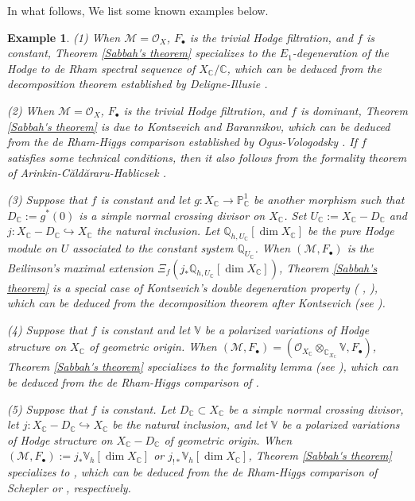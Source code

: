\documentclass[12pt, a4paper]{article}
\newtheorem{example}{Example}[section]
\begin{document}
 In what follows, We list some known examples below.
 \begin{example}\label{mod p proof Sabbah}
\upshape
(1) When $\mathcal M=\mathcal O_X$, $F_\bullet$ is the trivial Hodge filtration, and $f$ is constant, Theorem \ref{Sabbah's theorem} specializes to the $E_1$-degeneration of the Hodge to de Rham spectral sequence of $X_\mathbb{C}/\mathbb C$, which can be deduced from the decomposition theorem established by Deligne-Illusie \cite[Th\'eorème 2.1]{DI}.

(2) When $\mathcal M=\mathcal O_X$, $F_\bullet$ is the trivial Hodge filtration, and $f$ is dominant, Theorem \ref{Sabbah's theorem} is due to Kontsevich and Barannikov, which can be deduced from the de Rham-Higgs comparison established by Ogus-Vologodsky \cite[Theorem 4.23, 2]{OV}. If $f$ satisfies some technical conditions, then it also follows from the formality theorem of Arinkin-C\u{a}ld\u{a}raru-Hablicsek \cite[Theorem 4.16]{ACH}.

(3) Suppose that $f$ is constant and let $g:X_\mathbb{C}\to\mathbb P^1_\mathbb{C}$ be another morphism such that $D_\mathbb{C}:=g^*(0)$ is a simple normal crossing divisor on $X_\mathbb{C}$. Set $U_\mathbb{C}:=X_\mathbb{C}-D_\mathbb{C}$ and $j:X_\mathbb{C}-D_\mathbb{C}\hookrightarrow X_\mathbb{C}$ the natural inclusion. Let $\mathbb Q_{h,U_\mathbb{C}}[\dim X_\mathbb{C}]$ be the pure Hodge module on $U$ associated to the constant system $\mathbb Q_{U_\mathbb{C}}$. When $(\mathcal M,F_\bullet)$ is the Beilinson's maximal extension $\Xi_f(j_*\mathbb Q_{h,U_\mathbb{C}}[\dim X_\mathbb{C}])$, Theorem \ref{Sabbah's theorem} is a special case of Kontsevich's double degeneration property ( \cite[Theorem 2.18]{KKP}, \cite[Theorem 1.32]{ESY}), which can be deduced from the decomposition theorem after Kontsevich (see \cite[Theorem D.2.2]{ESY}).

(4) Suppose that $f$ is constant and let $\mathbb V$ be a polarized variations of Hodge structure on $X_\mathbb{C}$ of geometric origin. When $(\mathcal M,F_\bullet)=(\mathcal O_{X_\mathbb{C}}\otimes_{\mathbb C_{X_\mathbb{C}}}\mathbb V,F_\bullet)$, Theorem \ref{Sabbah's theorem} specializes to the formality lemma (see \cite[Lemma 2.2]{Sim}), which can be deduced from the de Rham-Higgs comparison of \cite[Corollary 2.27]{OV}. 

(5) Suppose that $f$ is constant. Let $D_\mathbb{C}\subset X_\mathbb{C}$ be a simple normal crossing divisor, let $j:X_\mathbb{C}-D_\mathbb{C}\hookrightarrow X_\mathbb{C}$ be the natural inclusion, and let $\mathbb V$ be a polarized variations of Hodge structure on $X_\mathbb{C}-D_\mathbb{C}$ of geometric origin. When $(\mathcal M,F_\bullet):=j_*\mathbb V_h[\dim X_\mathbb{C}]$ or $j_{!*}\mathbb V_h[\dim X_\mathbb{C}]$, Theorem \ref{Sabbah's theorem} specializes to \cite[Proposition 8.3.34]{CEGT}, which can be deduced from the de Rham-Higgs comparison of Schepler \cite[Corollary 5.7]{Schepler} or \cite[Corollary 3.6]{SZ2}, respectively.
\end{example}
\end{document}
